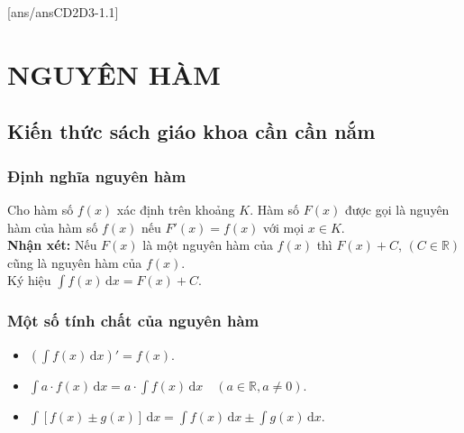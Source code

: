 [ans/ansCD2D3-1.1]
\section{NGUYÊN HÀM}
\subsection{Kiến thức sách giáo khoa cần cần nắm}
\subsubsection{Định nghĩa nguyên hàm}
Cho hàm số $f(x)$ xác định trên khoảng $K$. Hàm số $F(x)$ được gọi là nguyên hàm của hàm số $f(x)$ nếu $F'(x)=f(x)$ với mọi $x\in K$.\\
\textbf{Nhận xét:} Nếu $F(x)$ là một nguyên hàm của $f(x)$ thì $F(x)+C$, $(C\in\mathbb{R})$ cũng là nguyên hàm của $f(x)$.\\
Ký hiệu $\displaystyle\int f(x)\mathrm{\,d}x=F(x)+C$.\\
\subsubsection{Một số tính chất của nguyên hàm}
\begin{itemize}
	\item $\left(\displaystyle\int f(x)\mathrm{\,d}x\right)'=f(x)$.
	\item $\displaystyle\int a\cdot f(x)\mathrm{\,d}x=a\cdot\displaystyle\int f(x)\mathrm{\,d}x\quad\left(a\in\mathbb{R}, a\neq 0\right)$.
	\item $\displaystyle\int\left[f(x)\pm g(x)\right]\mathrm{\,d}x=\displaystyle\int f(x)\mathrm{\,d}x\pm\displaystyle\int g(x)\mathrm{\,d}x$.
\end{itemize}
